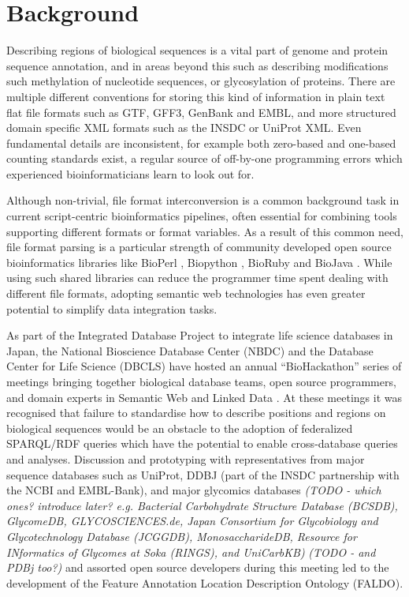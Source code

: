 \section*{Background}
Describing regions of biological sequences is a vital part of genome and protein sequence
annotation, and in areas beyond this such as describing modifications such methylation
of nucleotide sequences, or glycosylation of proteins.
There are multiple different conventions for storing this kind of information in
plain text flat file formats such as GTF, GFF3, GenBank and EMBL,
and more structured domain specific XML formats such as the INSDC or UniProt XML.
Even fundamental details are inconsistent, for example both zero-based and
one-based counting standards exist, a regular source of off-by-one programming
errors which experienced bioinformaticians learn to look out for.

Although non-trivial, file format interconversion is a common background task
in current script-centric bioinformatics pipelines, often essential for combining
tools supporting different formats or format variables.
As a result of this common need, file format parsing is a particular strength of
community developed open source bioinformatics libraries like BioPerl
\cite{BioPerl2002}, Biopython \cite{Biopython2009}, BioRuby \cite{BioRuby2010}
and BioJava \cite{BioJava2012}. While using such shared libraries can reduce the
programmer time spent dealing with different file formats, adopting semantic
web technologies has even greater potential to simplify data integration tasks.

As part of the Integrated Database Project to integrate life science databases in
Japan, the National Bioscience Database Center (NBDC) and the Database
Center for Life Science (DBCLS) have hosted an annual ``BioHackathon'' series
of meetings bringing together biological database teams, open source programmers,
and domain experts in Semantic Web and Linked Data \cite{BioHack2010,BioHack2011and2012}.
At these meetings it was recognised that failure to standardise how to describe positions
and regions on biological sequences would be an obstacle to the adoption of federalized
SPARQL/RDF queries which have the potential to enable cross-database queries and
analyses. Discussion and prototyping with representatives from major sequence databases
such as UniProt, DDBJ (part of the INSDC partnership with the NCBI and EMBL-Bank),
and major glycomics databases \textit{(TODO - which ones? introduce later? e.g.
 Bacterial Carbohydrate Structure Database (BCSDB), GlycomeDB,
 GLYCOSCIENCES.de,
 Japan Consortium for Glycobiology and Glycotechnology Database (JCGGDB),
 MonosaccharideDB,
 Resource for INformatics of Glycomes at Soka (RINGS),
 and UniCarbKB)}
\textit{(TODO - and PDBj too?)} and assorted open source developers during this meeting
led to the development of the Feature Annotation Location Description Ontology (FALDO).

